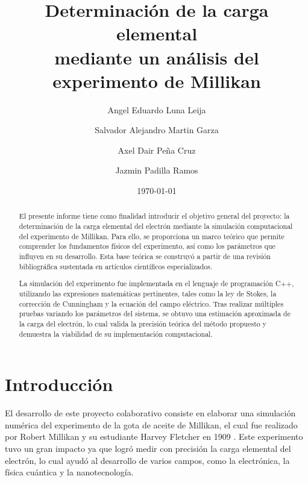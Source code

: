 \documentclass[
 reprint,
 amsmath,amssymb,
 aps,
]{revtex4-2}
\begin{document}

\title{Determinación de la carga elemental\\ mediante un análisis del experimento de Millikan} 

\author{Angel Eduardo Luna Leija}  
\author{Salvador Alejandro Martin Garza}
\author{Axel Dair Peña Cruz}
\author{Jazmin Padilla Ramos}
\date{\today} %

\begin{abstract}
    El presente informe tiene como finalidad introducir el objetivo general del proyecto: la determinación de la carga elemental del electrón mediante la simulación computacional del experimento de Millikan. Para ello, se proporciona un marco teórico que permite comprender los fundamentos físicos del experimento, así como los parámetros que influyen en su desarrollo. Esta base teórica se construyó a partir de una revisión bibliográfica sustentada en artículos científicos especializados.

    La simulación del experimento fue implementada en el lenguaje de programación C++, utilizando las expresiones matemáticas pertinentes, tales como la ley de Stokes, la corrección de Cunningham y la ecuación del campo eléctrico. Tras realizar múltiples pruebas variando los parámetros del sistema, se obtuvo una estimación aproximada de la carga del electrón, lo cual valida la precisión teórica del método propuesto y demuestra la viabilidad de su implementación computacional.
\end{abstract}

\maketitle 

\section{\label{sec:level1}Introducción} 
El desarrollo de este proyecto colaborativo consiste en elaborar una simulación numérica del experimento de la gota de aceite de Millikan, el cual fue realizado por Robert Millikan y su estudiante Harvey Fletcher en 1909 \cite{reto}. Este experimento tuvo un gran impacto ya que logró medir con precisión la carga elemental del electrón, lo cual ayudó al desarrollo de varios campos, como la electrónica, la física cuántica y la nanotecnología.
\end{document}
